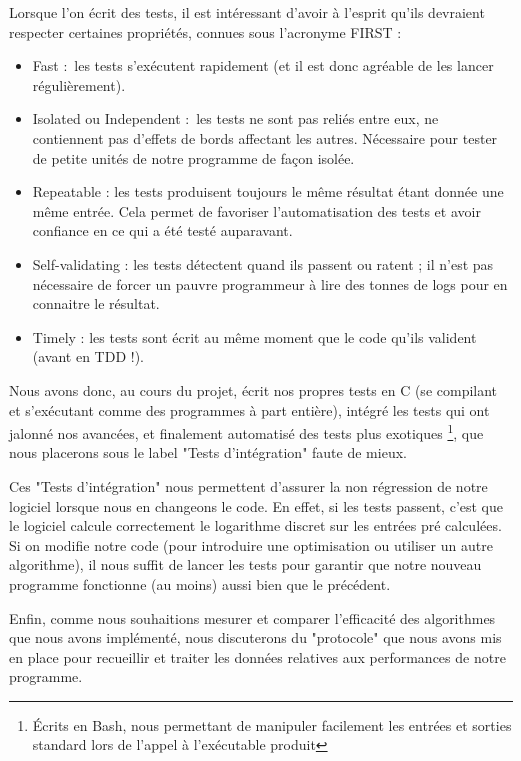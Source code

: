       Lorsque l'on écrit des tests, il est intéressant d'avoir à l'esprit qu'ils devraient respecter certaines propriétés, connues sous l'acronyme FIRST :
      \begin{itemize}
        \item Fast : les tests s'exécutent rapidement (et il est donc agréable de les lancer régulièrement).
        \item Isolated ou Independent : les tests ne sont pas reliés entre eux, ne contiennent pas d'effets de bords affectant les autres. Nécessaire pour tester de petite unités de notre programme de façon isolée.
        \item Repeatable : les tests produisent toujours le même résultat étant donnée une même entrée. Cela permet de favoriser l'automatisation des tests et avoir confiance en ce qui a été testé auparavant.
        \item Self-validating : les tests détectent quand ils passent ou ratent ; il n'est pas nécessaire de forcer un pauvre programmeur à lire des tonnes de logs pour en connaitre le résultat.
        \item Timely : les tests sont écrit au même moment que le code qu'ils valident (avant en TDD !).
      \end{itemize}

      Nous avons donc, au cours du projet, écrit nos propres tests en C (se compilant et s'exécutant comme des programmes à part entière), intégré les tests qui ont jalonné nos avancées, et finalement automatisé des tests plus exotiques \footnote{Écrits en Bash, nous permettant de manipuler facilement les entrées et sorties standard lors de l'appel à l'exécutable produit}, que nous placerons sous le label "Tests d'intégration" faute de mieux.

      Ces "Tests d'intégration" nous permettent d'assurer la non régression de notre logiciel lorsque nous en changeons le code. En effet, si les tests passent, c'est que le logiciel calcule correctement le logarithme discret sur les entrées pré calculées. Si on modifie notre code (pour introduire une optimisation ou utiliser un autre algorithme), il nous suffit de lancer les tests pour garantir que notre nouveau programme fonctionne (au moins) aussi bien que le précédent.

      Enfin, comme nous souhaitions mesurer et comparer l'efficacité des algorithmes que nous avons implémenté, nous discuterons du "protocole" que nous avons mis en place pour recueillir et traiter les données relatives aux performances de notre programme.


